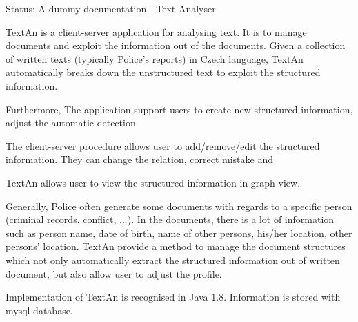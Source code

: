 Status: A dummy documentation - Text Analyser

TextAn is a client-server application for analysing text. It is to manage documents and exploit the information out of the 
documents. Given a collection of written texts (typically Police's reports) in Czech language, TextAn automatically breaks 
down the unstructured text to exploit the structured information.


Furthermore, The application support users to create new structured information, adjust the automatic detection 


The client-server procedure allows user to add/remove/edit the structured information. They can change the relation, correct 
mistake and

TextAn allows user to view the structured information in graph-view. 

Generally, Police often generate some documents with regards to a specific person (criminal records, conflict, ...). 
In the documents, there is a lot of information such as person name, date of birth, name of other persons, his/her 
location, other persons' location. TextAn provide a method to manage the document structures which not only automatically extract the structured information out of written document, but also allow user to adjust the profile.

Implementation of TextAn is recognised in Java 1.8. Information is stored with mysql database.
